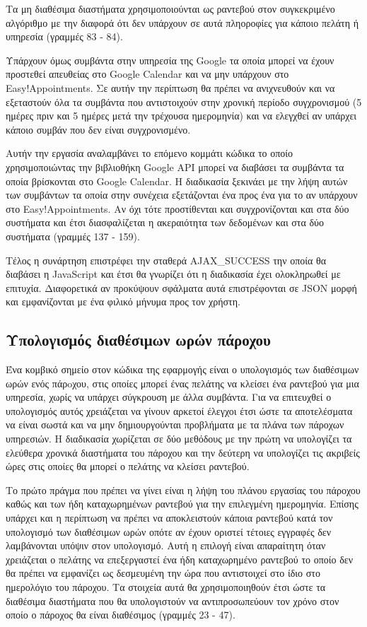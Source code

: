 Τα μη διαθέσιμα διαστήματα χρησιμοποιούνται ως ραντεβού στον συγκεκριμένο αλγόριθμο με την διαφορά ότι δεν υπάρχουν σε αυτά πληοροφίες για κάποιο πελάτη ή υπηρεσία (γραμμές 83 - 84).

Υπάρχουν όμως συμβάντα στην υπηρεσία της Google τα οποία μπορεί να έχουν προστεθεί απευθείας στο Google Calendar και να μην υπάρχουν στο Easy!Appointments. Σε αυτήν την περίπτωση θα πρέπει να ανιχνευθούν και να εξεταστούν όλα τα συμβάντα που αντιστοιχούν στην χρονική περίοδο συγχρονισμού (5 ημέρες πριν και 5 ημέρες μετά την τρέχουσα ημερομηνία) και να ελεγχθεί αν υπάρχει κάποιο συμβάν που δεν είναι συγχρονισμένο. 

Αυτήν την εργασία αναλαμβάνει το επόμενο κομμάτι κώδικα το οποίο χρησιμοποιώντας την βιβλιοθήκη Google API μπορεί να διαβάσει τα συμβάντα τα οποία βρίσκονται στο Google Calendar. Η διαδικασία ξεκινάει με την λήψη αυτών των συμβάντων τα οποία στην συνέχεια εξετάζονται ένα προς ένα για το αν υπάρχουν στο Easy!Appointments. Αν όχι τότε προστίθενται και συγχρονίζονται και στα δύο συστήματα και έτσι διασφαλίζεται η ακεραιότητα των δεδομένων και στα δύο συστήματα (γραμμές 137 - 159). 

Τέλος η συνάρτηση επιστρέφει την σταθερά AJAX\_SUCCESS την οποία θα διαβάσει η JavaScript και έτσι θα γνωρίζει ότι η διαδικασία έχει ολοκληρωθεί με επιτυχία. Διαφορετικά αν προκύψουν σφάλματα αυτά επιστρέφονται σε JSON μορφή και εμφανίζονται με ένα φιλικό μήνυμα προς τον χρήστη.

\subsection{Υπολογισμός διαθέσιμων ωρών πάροχου}
Ένα κομβικό σημείο στον κώδικα της εφαρμογής είναι ο υπολογισμός των διαθέσιμων ωρών ενός πάρoχου, στις οποίες μπορεί ένας πελάτης να κλείσει ένα ραντεβού για μια υπηρεσία, χωρίς να υπάρχει σύγκρουση με άλλα συμβάντα. Για να επιτευχθεί ο υπολογισμός αυτός χρειάζεται να γίνουν αρκετοί έλεγχοι έτσι ώστε τα αποτελέσματα να είναι σωστά και να μην δημιουργούνται προβλήματα με τα πλάνα των πάροχων υπηρεσιών. Η διαδικασία χωρίζεται σε δύο μεθόδους με την πρώτη να υπολογίζει τα ελεύθερα χρονικά διαστήματα του πάροχου και την δεύτερη να υπολογίζει τις ακριβείς ώρες στις οποίες θα μπορεί ο πελάτης να κλείσει ραντεβού.



Το πρώτο πράγμα που πρέπει να γίνει είναι η λήψη του πλάνου εργασίας του πάροχου καθώς και των ήδη καταχωρημένων ραντεβού για την επιλεγμένη ημερομηνία. Επίσης υπάρχει και η περίπτωση να πρέπει να αποκλειστούν κάποια ραντεβού κατά τον υπολογισμό των διαθέσιμων ωρών οπότε αν έχουν οριστεί τέτοιες εγγραφές δεν λαμβάνονται υπόψιν στον υπολογισμό. Αυτή η επιλογή είναι απαραίτητη όταν χρειάζεται ο πελάτης να επεξεργαστεί ένα ήδη καταχωρημένο ραντεβού το οποίο δεν θα πρέπει να εμφανίζει ως δεσμευμένη την ώρα που αντιστοιχεί στο ίδιο στο ημερολόγιο του πάροχου. Τα στοιχεία αυτά θα χρησιμοποιηθούν έτσι ώστε τα διαθέσιμα διαστήματα που θα υπολογιστούν να αντιπροσωπεύουν τον χρόνο στον οποίο ο πάροχος θα είναι διαθέσιμος (γραμμές 23 - 47).

